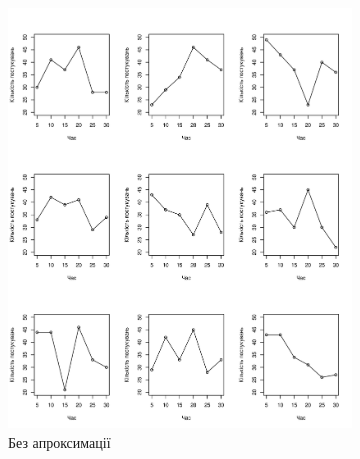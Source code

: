 \begin{figure}[h]
  \centering
  \begin{subfigure}[b]{0.45\textwidth}
    \includegraphics[width=\textwidth]{images/poisson}
    \caption{Без апроксимації}
    \label{fig:tapping:poisson}
  \end{subfigure}
  \begin{subfigure}[b]{0.45\textwidth}

\end{subfigure}
\end{figure}
